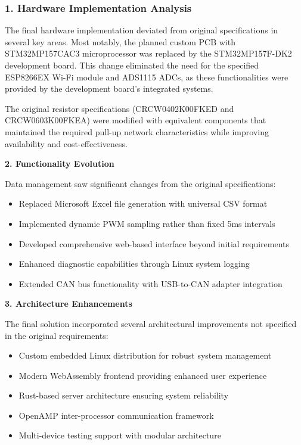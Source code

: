 \documentclass[12pt]{article}
\begin{document}
\subsubsection*{1. Hardware Implementation Analysis}

The final hardware implementation deviated from original specifications in
several key areas. Most notably, the planned custom PCB with STM32MP157CAC3
microprocessor was replaced by the STM32MP157F-DK2 development board. This
change eliminated the need for the specified ESP8266EX Wi-Fi module and ADS1115
ADCs, as these functionalities were provided by the development board's
integrated systems.

The original resistor specifications (CRCW0402K00FKED and CRCW0603K00FKEA) were
modified with equivalent components that maintained the required pull-up
network characteristics while improving availability and cost-effectiveness.

\textbf{2. Functionality Evolution}

Data management saw significant changes from the original specifications:
\begin{itemize} \item Replaced Microsoft Excel file generation with universal
    CSV format \item Implemented dynamic PWM sampling rather than fixed 5ms
    intervals \item Developed comprehensive web-based interface beyond initial
      requirements \item Enhanced diagnostic capabilities through Linux system
logging \item Extended CAN bus functionality with USB-to-CAN adapter
integration \end{itemize}

\textbf{3. Architecture Enhancements}

The final solution incorporated several architectural improvements not
specified in the original requirements:

\begin{itemize} 
  \item Custom embedded Linux distribution for robust system
  management 
  \item Modern WebAssembly frontend providing enhanced user
  experience 
  \item Rust-based server architecture ensuring system reliability
  \item OpenAMP inter-processor communication framework 
  \item Multi-device testing support with modular architecture \end{itemize}
\end{document}
